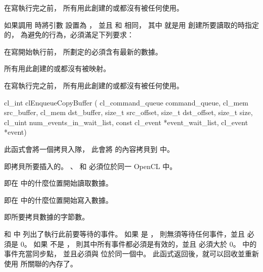 \item 在寫執行完之前，
所有用此創建的或都沒有被任何使用。
\stopigBase

如果調用  時將引數  設置為 ，
並且  和  相同，
其中  就是用  創建所要讀取的時指定的，
為避免的行為，必須滿足下列要求：
\startigBase
\item 在寫開始執行前，
 所劃定的必須含有最新的數據。

\item 所有用此創建的或都沒有被映射。

\item 在寫執行完之前，
所有用此創建的或都沒有被任何使用。
\stopigBase
\stopnotepar%


\startCLFUNC
cl_int clEnqueueCopyBuffer (
			cl_command_queue command_queue,
			cl_mem src_buffer,
			cl_mem dst_buffer,
			size_t src_offset,
			size_t dst_offset,
			size_t size,
			cl_uint num_events_in_wait_list,
			const cl_event *event_wait_list,
			cl_event *event)
\stopCLFUNC

此函式會將一個拷貝入隊，
此會將  的內容拷貝到  中。

 即拷貝所要插入的。
、  和 
必須位於同一 OpenCL 中。

 即在  中的什麼位置開始讀取數據。

 即在  中的什麼位置開始寫入數據。

 即所要拷貝數據的字節數。

 和  中
列出了執行此前要等待的事件。
如果  是 ，
則無須等待任何事件，並且  必須是 0。
如果  不是 ，
則其中所有事件都必須是有效的，並且  必須大於 0。
 中的事件充當同步點，
並且必須與  位於同一個中。
此函式返回後，就可以回收並重新使用  所關聯的內存了。

